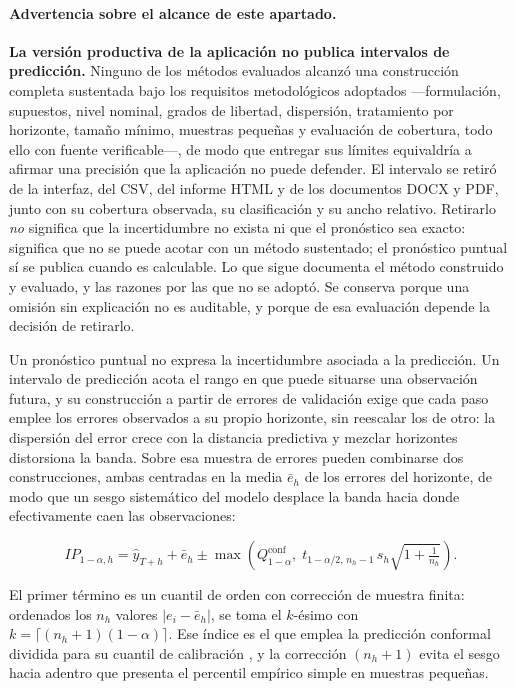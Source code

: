 \documentclass[12pt,letterpaper]{article}
\providecommand{\parencite}{\citep}
\begin{document}
\paragraph{Advertencia sobre el alcance de este apartado.} \textbf{La versión productiva de la aplicación no publica intervalos de predicción.} Ninguno de los métodos evaluados alcanzó una construcción completa sustentada bajo los requisitos metodológicos adoptados ---formulación, supuestos, nivel nominal, grados de libertad, dispersión, tratamiento por horizonte, tamaño mínimo, muestras pequeñas y evaluación de cobertura, todo ello con fuente verificable---, de modo que entregar sus límites equivaldría a afirmar una precisión que la aplicación no puede defender. El intervalo se retiró de la interfaz, del CSV, del informe HTML y de los documentos DOCX y PDF, junto con su cobertura observada, su clasificación y su ancho relativo. Retirarlo \emph{no} significa que la incertidumbre no exista ni que el pronóstico sea exacto: significa que no se puede acotar con un método sustentado; el pronóstico puntual sí se publica cuando es calculable. Lo que sigue documenta el método construido y evaluado, y las razones por las que no se adoptó. Se conserva porque una omisión sin explicación no es auditable, y porque de esa evaluación depende la decisión de retirarlo.

Un pronóstico puntual no expresa la incertidumbre asociada a la predicción. Un intervalo de predicción acota el rango en que puede situarse una observación futura, y su construcción a partir de errores de validación exige que cada paso emplee los errores observados a su propio horizonte, sin reescalar los de otro: la dispersión del error crece con la distancia predictiva y mezclar horizontes distorsiona la banda. Sobre esa muestra de errores pueden combinarse dos construcciones, ambas centradas en la media $\bar{e}_h$ de los errores del horizonte, de modo que un sesgo sistemático del modelo desplace la banda hacia donde efectivamente caen las observaciones:

\begin{equation}
IP_{1-\alpha,h}=\hat{y}_{T+h}+\bar{e}_h\pm\max\left(Q_{1-\alpha}^{\text{conf}},\;t_{1-\alpha/2,\,n_h-1}\,s_h\sqrt{1+\tfrac{1}{n_h}}\right).
\label{eq:ip_conformal}
\end{equation}

El primer término es un cuantil de orden con corrección de muestra finita: ordenados los $n_h$ valores $|e_i-\bar{e}_h|$, se toma el $k$-ésimo con $k=\lceil (n_h+1)(1-\alpha)\rceil$. Ese índice es el que emplea la predicción conformal dividida para su cuantil de calibración \parencite{lei2018conformal,angelopoulos2023conformal}, y la corrección $(n_h+1)$ evita el sesgo hacia adentro que presenta el percentil empírico simple en muestras pequeñas.
\end{document}
